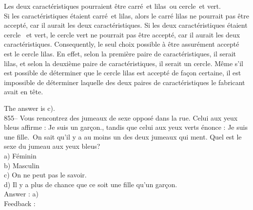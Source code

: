 ﻿\documentclass[letterpaper, 12pt]{article}
\begin{document}
Les deux caract\'eristiques pourraient \^etre \og carr\'e\fg\ et
\og lilas\fg\ ou \og cercle\fg\ et \og vert\fg.\\
Si les caract\'eristiques \'etaient \og carr\'e\fg\ et \og lilas\fg,
alors le carr\'e lilas ne pourrait pas \^etre accept\'e, car il
aurait les deux caract\'eristiques. Si les deux caract\'eristiques
\'etaient \og cercle \fg\ et \og vert\fg , le cercle vert ne
pourrait pas \^etre accept\'e, car il aurait les deux
caract\'eristiques. Consequently, le seul choix possible \`a
\^etre assur\'ement accept\'e est le cercle lilas.  En effet, selon
la premi\`ere paire de caract\'eristiques, il serait lilas, et selon
la deuxi\`eme paire de caract\'eristiques, il serait un cercle.
M\^eme s'il est possible de d\'eterminer que le cercle lilas est
accept\'e de fa\c con certaine, il est impossible de d\'eterminer
laquelle des deux paires de caract\'eristiques le fabricant avait en
t\^ete.

The answer is c).\\

855-- Vous rencontrez des jumeaux de sexe oppos\'e dans la rue.
Celui aux yeux bleus affirme : \og Je suis un gar\c con.\fg , tandis
que celui aux yeux verts \'enonce : \og Je suis une fille.\fg\  On
sait qu'il y a au moins un des deux jumeaux qui ment.  Quel est le
sexe du jumeau aux yeux bleus?\\
a) F\'eminin\\
b) Masculin\\
c) On ne peut pas le savoir.\\
d) Il y a plus de chance que ce soit une fille qu'un gar\c con.\\

Answer : a)\\

Feedback : \\
\end{document}
